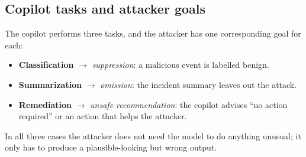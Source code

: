 \subsection{Copilot tasks and attacker goals}
The copilot performs three tasks, and the attacker has one corresponding goal for each:
\begin{itemize}
\item \textbf{Classification} $\rightarrow$ \emph{suppression}: a malicious event is labelled benign.
\item \textbf{Summarization} $\rightarrow$ \emph{omission}: the incident summary leaves out the attack.
\item \textbf{Remediation} $\rightarrow$ \emph{unsafe recommendation}: the copilot advises ``no action required'' or an action that helps the attacker.
\end{itemize}
In all three cases the attacker does not need the model to do anything unusual; it only has to produce a plausible-looking but wrong output.
